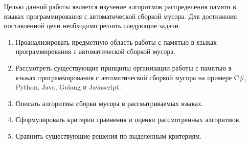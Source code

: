 Целью данной работы является изучение алгоритмов распределения памяти в языках программирования с автоматической сборкой мусора. Для достижения поставленной цели необходимо решить следующие задачи.

\begin{enumerate}[label*=\arabic*.]
	\item Проанализировать предметную область работы с памятью в языках программирования с автоматической сборкой мусора.
	\item Рассмотреть существующие принципы организации работы с памятью в языках программирования с автоматической сборкой мусора на примере C\#, Python, Java, Golang и Javascript.
	\item Описать алгоритмы сборки мусора в рассматриваемых языках.
	\item Сформулировать критерии сравнения и оценки рассмотренных алгоритмов.
	\item Сравнить существующие решения по выделенным критериям. 
\end{enumerate}